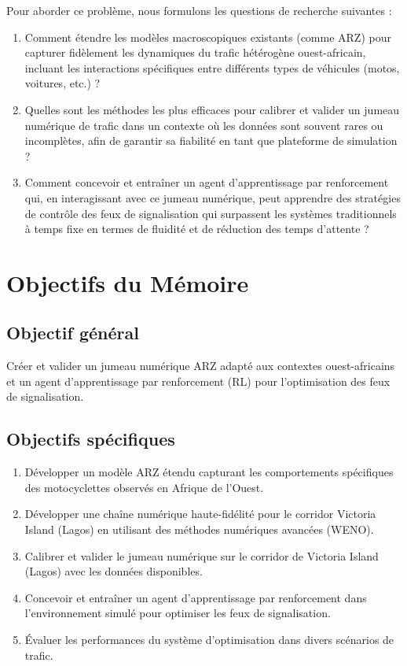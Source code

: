 Pour aborder ce problème, nous formulons les questions de recherche suivantes :
\begin{enumerate}
    \item Comment étendre les modèles macroscopiques existants (comme ARZ) pour capturer fidèlement les dynamiques du trafic hétérogène ouest-africain, incluant les interactions spécifiques entre différents types de véhicules (motos, voitures, etc.) ?
    \item Quelles sont les méthodes les plus efficaces pour calibrer et valider un jumeau numérique de trafic dans un contexte où les données sont souvent rares ou incomplètes, afin de garantir sa fiabilité en tant que plateforme de simulation ?
    \item Comment concevoir et entraîner un agent d'apprentissage par renforcement qui, en interagissant avec ce jumeau numérique, peut apprendre des stratégies de contrôle des feux de signalisation qui surpassent les systèmes traditionnels à temps fixe en termes de fluidité et de réduction des temps d'attente ?
\end{enumerate}

\section{Objectifs du Mémoire}
\label{sec:objectifs_memoire}

\subsection{Objectif général}
\label{subsec:objectif_general}

Créer et valider un jumeau numérique ARZ adapté aux contextes ouest-africains et un agent d'apprentissage par renforcement (RL) pour l'optimisation des feux de signalisation.

\subsection{Objectifs spécifiques}
\label{subsec:objectifs_specifiques}

\begin{enumerate}
    \item Développer un modèle ARZ étendu capturant les comportements spécifiques des motocyclettes observés en Afrique de l'Ouest.
    \item Développer une chaîne numérique haute-fidélité pour le corridor Victoria Island (Lagos) en utilisant des méthodes numériques avancées (WENO).
    \item Calibrer et valider le jumeau numérique sur le corridor de Victoria Island (Lagos) avec les données disponibles.
    \item Concevoir et entraîner un agent d'apprentissage par renforcement dans l'environnement simulé pour optimiser les feux de signalisation.
    \item Évaluer les performances du système d'optimisation dans divers scénarios de trafic.
\end{enumerate}

